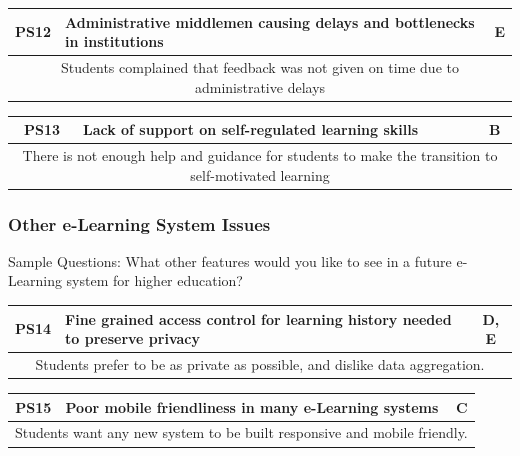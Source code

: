 \begin{table}[!ht]
	\begin{tabularx}{\textwidth}{|c|X|c|}
		\hline
		PS12 & \textbf{Administrative middlemen causing delays and bottlenecks in institutions} & E \\
		\hline
        \multicolumn{3}{|X|}{Students complained that feedback was not given on time due to administrative delays}                      \\
		\hline
	\end{tabularx}
\end{table}

\begin{table}[!ht]
	\begin{tabularx}{\textwidth}{|c|X|c|}
		\hline
		PS13 & \textbf{Lack of support on self-regulated learning skills} & B \\
		\hline
        \multicolumn{3}{|X|}{There is not enough help and guidance for students to make the transition to self-motivated learning}                      \\
		\hline
	\end{tabularx}
\end{table}

\subsubsection{Other e-Learning System Issues}

Sample Questions: What other features would you like to see in a future e-Learning system for 
higher education?

\begin{table}[!ht]
	\begin{tabularx}{\textwidth}{|c|X|c|}
		\hline
		PS14 & \textbf{Fine grained access control for learning history needed to preserve privacy} & D, E \\
		\hline
        \multicolumn{3}{|X|}{Students prefer to be as private as possible, and dislike data aggregation.}                      \\
		\hline
	\end{tabularx}
\end{table}

\begin{table}[!ht]
	\begin{tabularx}{\textwidth}{|c|X|c|}
		\hline
		PS15 & \textbf{Poor mobile friendliness in many e-Learning systems} & C \\
		\hline
        \multicolumn{3}{|X|}{Students want any new system to be built responsive and mobile friendly.}                      \\
		\hline
	\end{tabularx}
\end{table}

